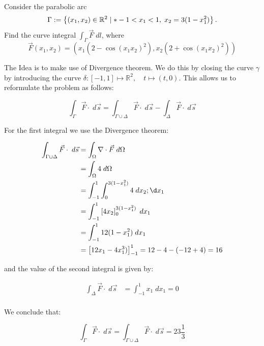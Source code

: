 \documentclass[11pt]{article}
\begin{document}
\begin{exercise}
    Consider the parabolic arc 
    \[
        \Gamma := \left\{ (x_1,x_2) \in \bbR^{2} \suchthat* -1 < x_1 < 1, \; x_2 = 3 ( 1 - x_1^2 ) \right\}.
    \]
    Find the curve integral $\int_\Gamma \vec F \;dl$, where 
    \[
        \vec F(x_1,x_2) = \left( x_1 ( 2 - \cos(x_1x_2)^{2} ), x_2 ( 2 + \cos(x_1x_2)^{2} ) \right)
    \]
\end{exercise}
\begin{solution}

The Idea is to make use of Divergence theorem. We do this by closing the curve $\gamma$ by introducing the curve $\delta: [-1,1] \mapsto \mathbb{R}^2, \quad t\mapsto  (t,0)$. This allows us to reformulate the problem as follows:

$$
\int_{\Gamma} \vec{F} \cdot \; d\vec{s} = \int_{\Gamma\cup \Delta} \vec{F} \cdot 
\; d\vec{s}-\int_{\Delta} \vec{F}\cdot \;d \vec{s}
$$

For the first integral we use the Divergence theorem:

\begin{align*}
\int_{\Gamma\cup\Delta} \vec{F} \cdot 
\; d\vec{s} &= \int_{\Omega} \nabla\cdot\vec{F}\;d \Omega\\
&=\int_{\Omega} 4\;d \Omega\\
&=\int_{-1}^1\int_{0}^{3(1-x_1^2)} 4 \;d x_2 ;\d x_1\\
&=\int_{-1}^1\left[4x_2\right]_{0}^{3(1-x_1^2)}  \;d x_1\\
&=\int_{-1}^1 12( 1-x_1^2)\;d x_1\\
&=\left[12x_1-4x_1^3)\right]_{-1}^1 = 12 - 4 - (-12 + 4) = 16\\
\end{align*}

and the value of the second integral is given by:

\begin{align*}
\int_{\Delta} \vec{F} \cdot 
\; d\vec{s} &= \int_{-1}^1 x_1 
\; dx_1 =0\\
\end{align*}

We conclude that:

$$
\int_{\Gamma} \vec{F} \cdot \; d\vec{s} = \int_{\Gamma\cup \Delta} \vec{F} \cdot 
\; d\vec{s} = 23\frac{1}{3}
$$

\end{solution}
\end{document}
